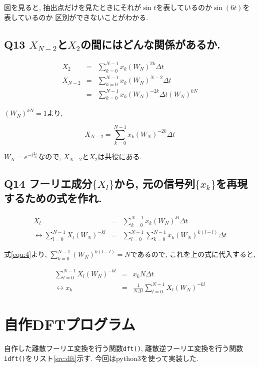 \documentclass[titlepage]{jsarticle}
\begin{document}
        図を見ると,
        抽出点だけを見たときにそれが$\sin t$を表しているのか$\sin(6t)$を表しているのか
        区別ができないことがわかる.

    \subsection{Q13 $X_{N-2}$と$X_2$の間にはどんな関係があるか.}
        \begin{eqnarray}
            X_{2}&=&\sum_{k=0}^{N-1}x_k(W_N)^{2k}\Delta t\nonumber\\
            X_{N-2}&=&\sum_{k=0}^{N-1}x_k(W_N)^{N-2}\Delta t\nonumber\\
                    &=&\sum_{k=0}^{N-1}x_k(W_N)^{-2k}\Delta t(W_N)^{kN}\nonumber
        \end{eqnarray}
            
        $(W_N)^{kN}=1$より,

        \begin{equation*}
            X_{N-2}=\sum_{k=0}^{N-1}x_k(W_N)^{-2k}\Delta t
        \end{equation*}

        $W_N=e^{-i\frac{2\pi}{N}}$なので,
        $X_{N-2}$と$X_2$は共役にある.

    \subsection{Q14 フーリエ成分$\{X_l\}$から, 元の信号列$\{x_k\}$を再現するための式を作れ.}
        \begin{eqnarray}
            X_l &=& \sum^{N - 1}_{k = 0}x_k(W_N)^{kl}\Delta t \nonumber \\
            \leftrightarrow \sum^{N - 1}_{l = 0}X_l(W_N)^{-kl} &=& \sum^{N - 1}_{l = 0}\sum^{N - 1}_{k = 0}x_k(W_N)^{k(l - l)}\Delta t \nonumber
        \end{eqnarray}

        式\ref{equ:4}より, $\displaystyle\sum^{N - 1}_{k = 0}(W_N)^{k(l-l)}=N$であるので,
        これを上の式に代入すると,

        \begin{eqnarray}
            \sum^{N - 1}_{l = 0}X_l(W_N)^{-kl} &=& x_kN\Delta t \nonumber \\
            \leftrightarrow x_k &=& \frac{1}{N\Delta t}\sum^{N - 1}_{l = 0}X_l(W_N)^{-kl} \nonumber
        \end{eqnarray}

\section{自作DFTプログラム}
    自作した離散フーリエ変換を行う関数\verb|dft()|,
    離散逆フーリエ変換を行う関数\verb|idft()|をリスト\ref{src:dft}示す.
    今回はpython3を使って実装した.
\end{document}
